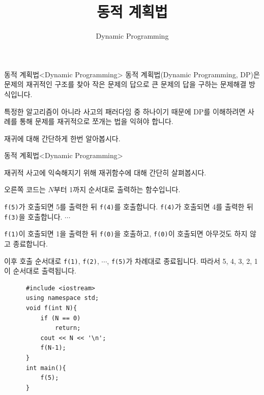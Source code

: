 

\title{동적 계획법}
\subtitle{Dynamic Programming}



\frame{\titlepage}

\begin{frame}{동적 계획법}{<Dynamic Programming>}
  \vspace{4mm}
  동적 계획법(Dynamic Programming, DP)은 문제의 \alert{재귀적인 구조}를 찾아
  작은 문제의 답으로 큰 문제의 답을 구하는 문제해결 방식입니다.\par\vspace{2mm}
  특정한 알고리즘이 아니라 사고의 패러다임 중 하나이기 때문에
  DP를 이해하려면 사례를 통해 문제를 재귀적으로 쪼개는 법을 익혀야 합니다.\par\vspace{2mm}
  재귀에 대해 간단하게 한번 알아봅시다.
\end{frame}

\begin{frame}[fragile]{동적 계획법}{<Dynamic Programming>}
  \begin{twocol}
    재귀적 사고에 익숙해지기 위해 재귀함수에 대해 간단히 살펴봅시다.\par\vspace{1mm}
    오른쪽 코드는 $N$부터 1까지 순서대로 출력하는 함수입니다.\par\vspace{1mm}
    \texttt{f(5)}가 호출되면 5를 출력한 뒤 \texttt{f(4)}를 호출합니다.
    \texttt{f(4)}가 호출되면 4를 출력한 뒤 \texttt{f(3)}을 호출합니다. $\cdots$\par\vspace{1mm}
    \texttt{f(1)}이 호출되면 1을 출력한 뒤 \texttt{f(0)}을 호출하고,
    \texttt{f(0)}이 호출되면 아무것도 하지 않고 종료합니다.\par\vspace{1mm}
    이후 호출 순서대로 \texttt{f(1)}, \texttt{f(2)}, $\cdots$, \texttt{f(5)}가 차례대로 종료됩니다.
    따라서 5, 4, 3, 2, 1이 순서대로 출력됩니다.
  \colsplit
    \begin{verbatim}
      #include <iostream>
      using namespace std;
      void f(int N){
          if (N == 0)
              return;
          cout << N << '\n';
          f(N-1);
      }
      int main(){
          f(5);
      }
    \end{verbatim}
  \end{twocol}
\end{frame}

